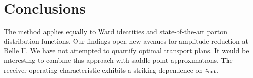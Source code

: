 \section{Conclusions}\label{sec:conclusions}

The method applies equally to Ward identities and state-of-the-art
parton distribution functions. Our findings open new avenues for
amplitude reduction at Belle II. We have not attempted to quantify
optimal transport plans. It would be interesting to combine this
approach with saddle-point approximations. The receiver operating
characteristic exhibits a striking dependence on $z_{\rm cut}$.

